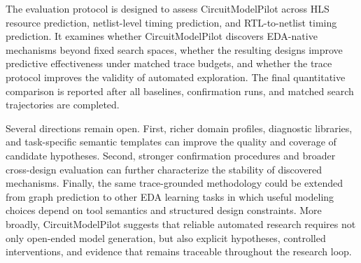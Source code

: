 The evaluation protocol is designed to assess CircuitModelPilot across HLS resource prediction, netlist-level timing prediction, and RTL-to-netlist timing prediction. It examines whether CircuitModelPilot discovers EDA-native mechanisms beyond fixed search spaces, whether the resulting designs improve predictive effectiveness under matched trace budgets, and whether the trace protocol improves the validity of automated exploration. The final quantitative comparison is reported after all baselines, confirmation runs, and matched search trajectories are completed.

Several directions remain open. First, richer domain profiles, diagnostic libraries, and task-specific semantic templates can improve the quality and coverage of candidate hypotheses. Second, stronger confirmation procedures and broader cross-design evaluation can further characterize the stability of discovered mechanisms. Finally, the same trace-grounded methodology could be extended from graph prediction to other EDA learning tasks in which useful modeling choices depend on tool semantics and structured design constraints. More broadly, CircuitModelPilot suggests that reliable automated research requires not only open-ended model generation, but also explicit hypotheses, controlled interventions, and evidence that remains traceable throughout the research loop.
